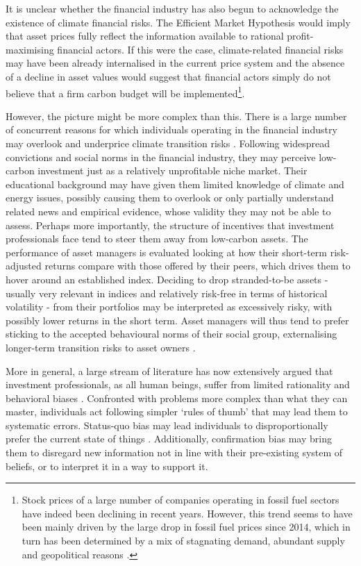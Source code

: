 \documentclass[authoryear]{article}
\begin{document}
It is unclear whether the financial industry has also begun to acknowledge the existence of climate financial risks. The Efficient Market Hypothesis \citep{Fama1970} would imply that asset prices fully reflect the information available to rational profit-maximising financial actors. If this were the case, climate-related financial risks may have been already internalised in the current price system and the absence of a decline in asset values would suggest that financial actors simply do not believe that a firm carbon budget will be implemented\footnote{Stock prices of a large number of companies operating in fossil fuel sectors have indeed been declining in recent years. However, this trend seems to have been mainly driven by the large drop in fossil fuel prices since 2014, which in turn has been determined by a mix of stagnating demand, abundant supply and geopolitical reasons \citep{Baumeister2016}.}.

However, the picture might be more complex than this. There is a large number of concurrent reasons for which individuals operating in the financial industry may overlook and underprice climate transition risks \citep{Silver2017, Weber2017}. Following widespread convictions and social norms in the financial industry, they may perceive low-carbon investment just as a relatively unprofitable niche market. Their educational background may have given them limited knowledge of climate and energy issues, possibly causing them to overlook or only partially understand related news and empirical evidence, whose validity they may not be able to assess. Perhaps more importantly, the structure of incentives that investment professionals face tend to steer them away from low-carbon assets. The performance of asset managers is evaluated looking at how their short-term risk-adjusted returns compare with those offered by their peers, which drives them to hover around an established index. Deciding to drop stranded-to-be assets - usually very relevant in indices and relatively risk-free in terms of historical volatility - from their portfolios may be interpreted as excessively risky, with possibly lower returns in the short term. Asset managers will thus tend to prefer sticking to the accepted behavioural norms of their social group, externalising longer-term transition risks to asset owners \citep{Thoma2017}. 

More in general, a large stream of literature has now extensively argued that investment professionals, as all human beings, suffer from limited rationality and behavioral biases \citep{Simon1959, Kahneman1979, Hirshleifer2001}. Confronted with problems more complex than what they can master, individuals act following simpler `rules of thumb' that may lead them to systematic errors. Status-quo bias may lead individuals to disproportionally prefer the current state of things \citep{Samuelson1988}. Additionally, confirmation bias may bring them to disregard new information not in line with their pre-existing system of beliefs, or to interpret it in a way to support it. 
\end{document}
